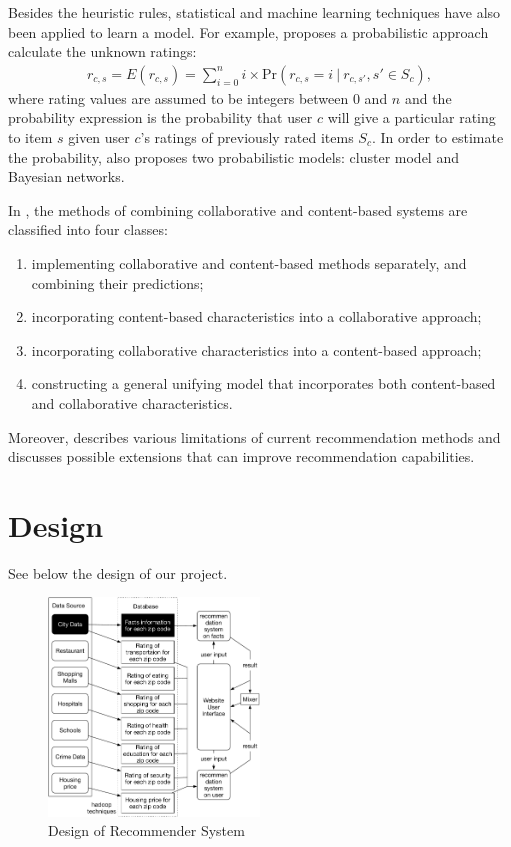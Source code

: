 \documentclass[letterpaper,twocolumn,10pt]{article}
\begin{document}
Besides the heuristic rules,  statistical and machine learning techniques have also  been applied to  learn a model. For example, \cite{BHK98} proposes a probabilistic approach calculate the unknown ratings:
\begin{align} \label{prob}
r_{c, s} = E(r_{c, s}) = \sum_{i=0}^n i\times \text{Pr}(r_{c, s} =i\ |\ r_{c, s'}, s'\in S_c ), 
\end{align}
where rating values are assumed to be integers between  0 and $n$ and the probability expression is the probability that user $c$ will give a particular rating to item $s$ given user $c$'s ratings of previously rated items $S_c$.  In order to estimate  the probability, \cite{BHK98} also proposes two  probabilistic models: cluster model and Bayesian networks.  

In \cite{AT05}, the methods of combining  collaborative and content-based systems are classified into four classes:
\begin{enumerate}
\item implementing collaborative and content-based methods separately, and combining their predictions;
\item incorporating content-based characteristics into a collaborative approach;
\item incorporating collaborative characteristics into a content-based approach;
\item constructing a general unifying model that incorporates both content-based and collaborative characteristics.
\end{enumerate}

Moreover, \cite{AT05}  describes various limitations of current recommendation methods and discusses possible extensions that can improve recommendation capabilities. 

\section{Design}
 See below the design of our project.
\begin{figure}[h!]\label{fig1}
\begin{center}
\includegraphics[width=0.5\textwidth]{design.pdf}
\end{center}
\caption{ Design of Recommender System}
\end{figure}
\end{document}
